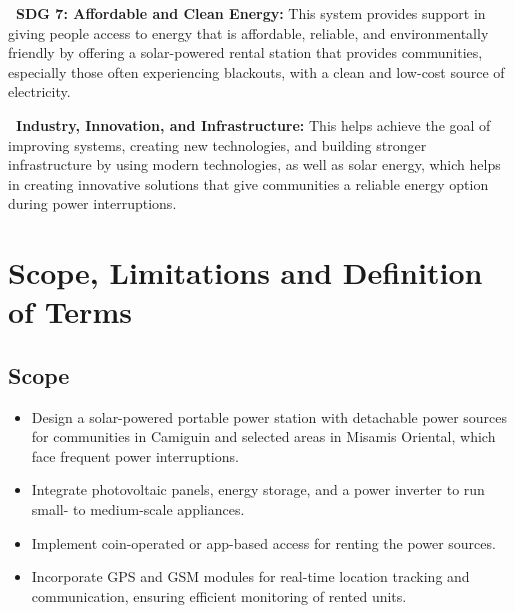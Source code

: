 {\vspace{0.6em} 
\addtocounter{subsection}{1}
\noindent\textbf{\thesubsection\ SDG 7: Affordable and Clean Energy:} 
This system provides support in giving people access to energy that is affordable, reliable, and environmentally friendly by offering a solar-powered rental station that provides communities, especially those often experiencing blackouts, with a clean and low-cost source of electricity.

\vspace{0.6em} 
\addtocounter{subsection}{1}
\noindent\textbf{\thesubsection\ Industry, Innovation, and Infrastructure:} 
 This helps achieve the goal of improving systems, creating new technologies, and building stronger infrastructure by using modern technologies, as well as solar energy, which helps in creating innovative solutions that give communities a reliable energy option during power interruptions.


\section{Scope, Limitations and Definition of Terms}

\subsection{Scope}
	\begin{itemize}
		\item Design a solar-powered portable power station with detachable power sources for communities in Camiguin and selected areas in Misamis Oriental, which face frequent power interruptions.
		\item Integrate photovoltaic panels, energy storage, and a power inverter to run small- to medium-scale appliances.
		\item Implement coin-operated or app-based access for renting the power sources.
		\item Incorporate GPS and GSM modules for real-time location tracking and communication, ensuring efficient monitoring of rented units.
\end{itemize}

}
